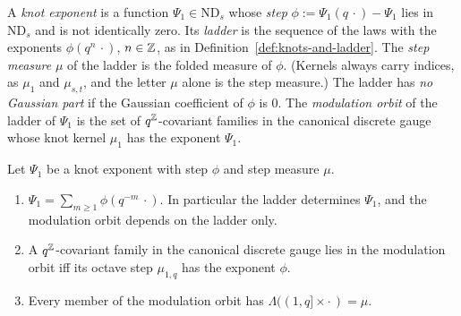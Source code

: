 \begin{definition}
\label{def:modulation-orbit}

A \emph{knot exponent} is a function $\Psi_1 \in \mathrm{ND}_s$ whose \emph{step}
$\phi := \Psi_1(q\,\cdot) - \Psi_1$ lies in $\mathrm{ND}_s$ and is not identically zero. Its
\emph{ladder} is the sequence of the laws with the exponents $\phi(q^n\,\cdot)$, $n \in \mathbb{Z}$, as in
Definition~\ref{def:knots-and-ladder}. The \emph{step measure} $\mu$ of the ladder is the folded
\Levy{} measure of $\phi$. (Kernels always carry indices, as $\mu_1$ and $\mu_{s,t}$, and the letter
$\mu$ alone is the step measure.) The ladder has \emph{no Gaussian part} if the Gaussian
coefficient of $\phi$ is $0$. The \emph{modulation orbit} of the ladder of $\Psi_1$ is the set of
$q^{\mathbb{Z}}$-covariant families in the canonical discrete gauge whose knot kernel $\mu_1$ has the
exponent $\Psi_1$.
\end{definition}

\begin{lemma}
\label{lem:knot-exponent-ladder}

Let $\Psi_1$ be a knot exponent with step $\phi$ and step measure $\mu$.
\begin{enumerate}
\item $\Psi_1 = \sum_{m \ge 1}\phi(q^{-m}\,\cdot)$. In particular the ladder determines $\Psi_1$,
and the modulation orbit depends on the ladder only.
\item A $q^{\mathbb{Z}}$-covariant family in the canonical discrete gauge lies in the modulation orbit iff
its octave step $\mu_{1,q}$ has the exponent $\phi$.
\item Every member of the modulation orbit has $\Lambda((1,q] \times \cdot\,) = \mu$.
\end{enumerate}
\end{lemma}


